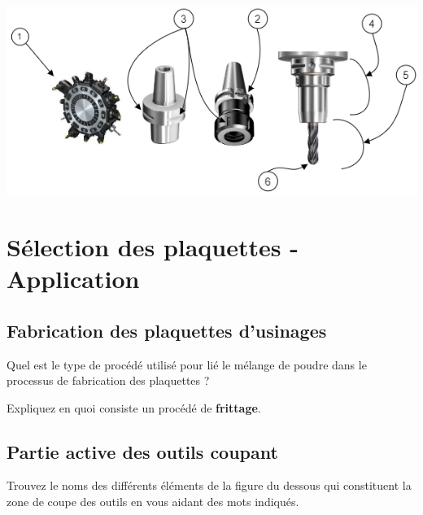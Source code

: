 \documentclass[12pt,a4paper]{article} %
\begin{document}
\includegraphics[scale=0.95]{FF1.png}




\section{Sélection des plaquettes - Application}
\subsection{Fabrication des plaquettes d'usinages}

\begin{exo} Quel est le type de procédé utilisé pour lié le mélange de poudre dans le processus de fabrication des plaquettes ?\end{exo}



\begin{exo} Expliquez en quoi consiste un procédé de \textbf{frittage}.\end{exo}


\newpage

\subsection{Partie active des outils coupant}

\begin{exo} Trouvez le noms des différents éléments de la figure du dessous qui constituent la zone de coupe des outils en vous aidant des mots indiqués.\end{exo}
\end{document}
